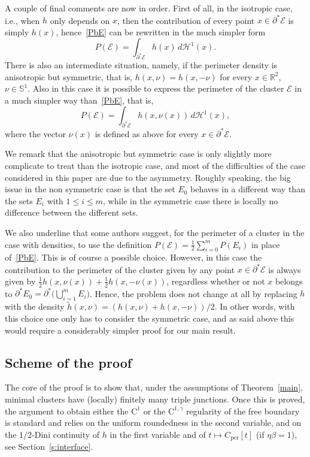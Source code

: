 \documentclass[11pt]{article}
\newcommand{\ie}{i.e.,\xspace}
\numberwithin{equation}{section}
\newcommand\R{\mathbb{R}}
\renewcommand\S{\mathbb{S}}
\newcommand\Ceeb{C_\mathrm{per}}
\newcommand\E{\mathcal{E}}
\renewcommand\H{\mathcal{H}}
\theoremstyle{plain}
\theoremstyle{definition}
\begin{document}
A couple of final comments are now in order. First of all, in the isotropic case, \ie when $h$ only depends on $x$, then the contribution of every point $x\in\partial^*\E$ is simply $h(x)$, hence~\eqref{PbE} can be rewritten in the much simpler form
\[
P(\E) = \int_{\partial^*\E} h(x)\, d\H^1(x).
\]
There is also an intermediate situation, namely, if the perimeter density is anisotropic but symmetric, that is, $h(x,\nu)=h(x,-\nu)$ for every $x\in\R^2$, $\nu\in\S^1$. Also in this case it is possible to express the perimeter of the cluster $\E$ in a much simpler way than~\eqref{PbE}, that is,
\[
P(\E) = \int_{\partial^*\E} h(x,\nu(x))\, d\H^1(x),
\]
where the vector $\nu(x)$ is defined as above for every $x\in\partial^*\E$.

We remark that the anisotropic but symmetric case is only slightly more complicate to treat than the isotropic case, and most of the difficulties of the case considered in this paper are due to the asymmetry. Roughly speaking, the big issue in the non symmetric case is that the set $E_0$ behaves in a different way than the sets $E_i$ with $1\leq i \leq m$, while in the symmetric case there is locally no difference between the different sets.

We also underline that some authors suggest, for the perimeter of a cluster in the case with densities, to use the definition $P(\E) = \frac 12 \sum_{i=0}^m P(E_i)$ in place of~\eqref{PbE}. This is of course a possible choice. However, in this case the contribution to the perimeter of the cluster given by any point $x\in\partial^*\E$ is always given by $\frac 12 h(x,\nu(x))+ \frac 12 h(x,-\nu(x))$, regardless whether or not $x$ belongs to $\partial^* E_0 = \partial^* \big(\bigcup_{i=1}^m E_i\big)$. Hence, the problem does not change at all by replacing $h$ with the density $\tilde h(x,\nu)=(h(x,\nu)+h(x,-\nu))/2$. In other words, with this choice one only has to consider the symmetric case, and as said above this would require a considerably simpler proof for our main result.\enlargethispage{.5\baselineskip}%

\subsection{Scheme of the proof\label{sec:exproof}}

The core of the proof is to show that, under the assumptions of Theorem~\ref{main}, minimal clusters have (locally) finitely many triple junctions.
Once this is proved, the argument to obtain either the $\mathrm{C}^1$ or the $\mathrm{C}^{1,\gamma}$ regularity of the free boundary is standard and relies on the uniform roundedness in the second variable, and on the $1/2$-Dini continuity of $h$ in the first variable and of $t\mapsto \Ceeb[t]$
(if $\eta\beta=1$), see Section~\ref{s:interface}.
\end{document}
